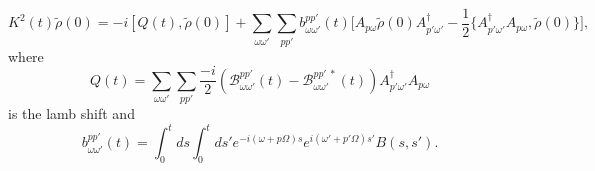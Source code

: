 \documentclass[10pt]{article}
\numberwithin{equation}{section}
\begin{document}
\begin{equation}
K^{2}(t)\tilde{\rho}(0) = -i[Q(t),\tilde{\rho}(0)] + \sum_{\omega\omega '}\sum_{pp'}b_{\omega\omega '}^{pp'}(t)\bigg[A_{p\omega}\tilde{\rho}(0)A_{p'\omega '}^{\dagger} - \frac{1}{2}\{A_{p'\omega'}^{\dagger}A_{p\omega},\tilde{\rho}(0)\}\bigg],
\end{equation}
where
\begin{equation}
Q(t) =  \sum_{\omega\omega '}\sum_{pp'}\frac{-i}{2}(\mathcal{B}_{\omega\omega '}^{pp'}(t)  - \mathcal{B}_{\omega\omega '}^{pp'\:*}(t))A_{p'\omega '}^{\dagger}A_{p\omega}
\end{equation}
is the lamb shift and 
\begin{equation}\label{eq:6}
b_{\omega\omega '}^{pp'}(t) = \int_0^t ds \int_0^t ds'  e^{-i(\omega + p\Omega)s}e^{i(\omega ' + p'\Omega)s'}B(s,s').
\end{equation}
\end{document}
